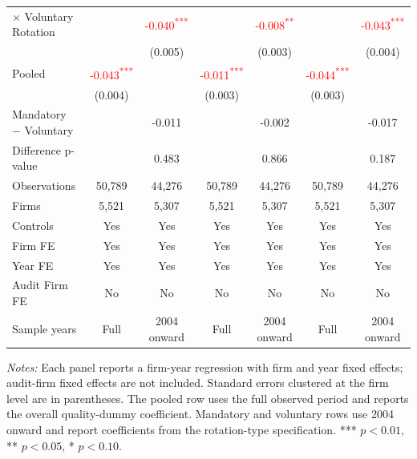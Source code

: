 \documentclass[10pt]{article}
\newcommand{\sym}[1]{\textsuperscript{#1}}
\begin{document}
\begin{minipage}{19cm}
\begin{threeparttable}
\begin{tabular}{l cc cc cc}
$\times$ Voluntary Rotation &  & \textcolor{red}{-0.040\sym{***}} &  & \textcolor{red}{-0.008\sym{**}} &  & \textcolor{red}{-0.043\sym{***}} \\
 &  & (0.005) &  & (0.003) &  & (0.004) \\
Pooled & \textcolor{red}{-0.043\sym{***}} &  & \textcolor{red}{-0.011\sym{***}} &  & \textcolor{red}{-0.044\sym{***}} &  \\
 & (0.004) &  & (0.003) &  & (0.003) &  \\
Mandatory $-$ Voluntary &  & -0.011 &  & -0.002 &  & -0.017 \\
Difference p-value &  & 0.483 &  & 0.866 &  & 0.187 \\
Observations & 50,789 & 44,276 & 50,789 & 44,276 & 50,789 & 44,276 \\
Firms & 5,521 & 5,307 & 5,521 & 5,307 & 5,521 & 5,307 \\
\midrule
Controls & Yes & Yes & Yes & Yes & Yes & Yes \\
Firm FE & Yes & Yes & Yes & Yes & Yes & Yes \\
Year FE & Yes & Yes & Yes & Yes & Yes & Yes \\
Audit Firm FE & No & No & No & No & No & No \\
Sample years & Full & 2004 onward & Full & 2004 onward & Full & 2004 onward \\
\bottomrule
\end{tabular}
\begin{tablenotes}\fontsize{9}{11}\selectfont
\item \fontsize{9}{11}\selectfont \textit{Notes:} Each panel reports a firm-year regression with firm and year fixed effects; audit-firm fixed effects are not included. Standard errors clustered at the firm level are in parentheses. The pooled row uses the full observed period and reports the overall quality-dummy coefficient. Mandatory and voluntary rows use 2004 onward and report coefficients from the rotation-type specification. *** \(p<0.01\), ** \(p<0.05\), * \(p<0.10\).
\end{tablenotes}
\end{threeparttable}

\end{minipage}
\end{document}
